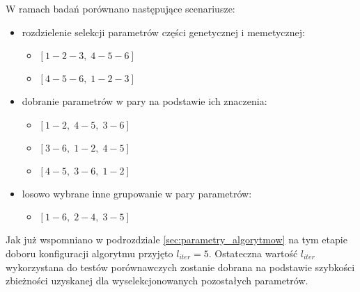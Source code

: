 \par
W ramach badań porównano następujące scenariusze:
\begin{itemize}
\item rozdzielenie selekcji parametrów części genetycznej i memetycznej:
\begin{itemize}
\item $[1-2-3,\; 4-5-6]$
\item $[4-5-6,\; 1-2-3]$
\end{itemize}
\item dobranie parametrów w pary na podstawie ich znaczenia:
\begin{itemize}
\item $[1-2,\; 4-5,\; 3-6]$
\item $[3-6,\; 1-2,\; 4-5]$
\item $[4-5,\; 3-6,\; 1-2]$
\end{itemize}
\item losowo wybrane inne grupowanie w pary parametrów:
\begin{itemize}
\item $[1-6,\; 2-4,\; 3-5]$
\end{itemize}
\end{itemize}
\par
Jak już wspomniano w podrozdziale \ref{sec:parametry_algorytmow} na tym etapie doboru konfiguracji algorytmu przyjęto $l_{iter}=5$. Ostateczna wartość $l_{iter}$ wykorzystana do testów porównawczych zostanie dobrana na podstawie szybkości zbieżności uzyskanej dla wyselekcjonowanych pozostałych parametrów.


